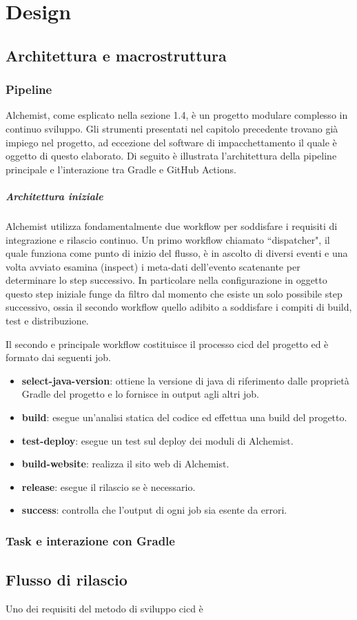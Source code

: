 \chapter{Design}

\section{Architettura e macrostruttura}

\subsection{Pipeline}

Alchemist, come esplicato nella sezione 1.4, è un progetto modulare complesso in continuo sviluppo. Gli strumenti presentati nel capitolo precedente trovano già impiego nel progetto, ad eccezione del software di impacchettamento il quale è oggetto di questo elaborato. Di seguito è illustrata l'architettura della pipeline principale e l'interazione tra Gradle e GitHub Actions.
\paragraph{Architettura iniziale} Alchemist utilizza fondamentalmente due workflow per soddisfare i requisiti di integrazione e rilascio continuo. Un primo workflow chiamato ``dispatcher", il quale funziona come punto di inizio del flusso, è in ascolto di diversi eventi e una volta avviato esamina (inspect) i meta-dati dell'evento scatenante per determinare lo step successivo. In particolare nella configurazione in oggetto questo step iniziale funge da filtro dal momento che esiste un solo possibile step successivo, ossia il secondo workflow quello adibito a soddisfare i compiti di build, test e distribuzione.


Il secondo e principale workflow costituisce il processo \ac{cicd} del progetto ed è formato dai seguenti job.
\begin{itemize}
	\item \textbf{select-java-version}: ottiene la versione di java di riferimento dalle proprietà Gradle del progetto e lo fornisce in output agli altri job.
	\item \textbf{build}: esegue un'analisi statica del codice ed effettua una build del progetto. 
	\item \textbf{test-deploy}: esegue un test sul deploy dei moduli di Alchemist.
	\item \textbf{build-website}: realizza il sito web di Alchemist.
	\item \textbf{release}: esegue il rilascio se è necessario.
	\item \textbf{success}: controlla che l'output di ogni job sia esente da errori.
\end{itemize}

\paragraph{}

\subsection{Task e interazione con Gradle}

\section{Flusso di rilascio}
Uno dei requisiti del metodo di sviluppo \ac{cicd} è 
